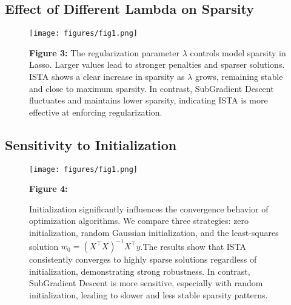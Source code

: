\documentclass[11pt]{article}
\begin{document}


\subsection{Effect of Different Lambda on Sparsity}

\begin{figure}[H]
    \centering
    \begin{minipage}{0.3\textwidth}
        \texttt{[image: figures/fig1.png]}
    \end{minipage}
    \hfill
    \begin{minipage}{0.5\textwidth}
        \small
        \textbf{Figure 3:}
        The regularization parameter \( \lambda \) controls model sparsity in Lasso. Larger values lead to stronger penalties and sparser solutions.
        ISTA shows a clear increase in sparsity as \( \lambda \) grows, remaining stable and close to maximum sparsity. In contrast, SubGradient Descent fluctuates and maintains lower sparsity, indicating ISTA is more effective at enforcing regularization.
    \end{minipage}
\end{figure}




\subsection{Sensitivity to Initialization}

\begin{figure}[H]
    \centering
    \begin{minipage}{0.3\textwidth}
        \texttt{[image: figures/fig1.png]}
    \end{minipage}
    \hfill
    \begin{minipage}{0.5\textwidth}
        \small
        \textbf{Figure 4:}

        Initialization significantly influences the convergence behavior of optimization algorithms. We compare three strategies: zero initialization, random Gaussian initialization, and the least-squares solution \( w_0 = (X^\top X)^{-1} X^\top y \).The results show that ISTA consistently converges to highly sparse solutions regardless of initialization, demonstrating strong robustness. In contrast, SubGradient Descent is more sensitive, especially with random initialization, leading to slower and less stable sparsity patterns.


    \end{minipage}
\end{figure}
\end{document}
